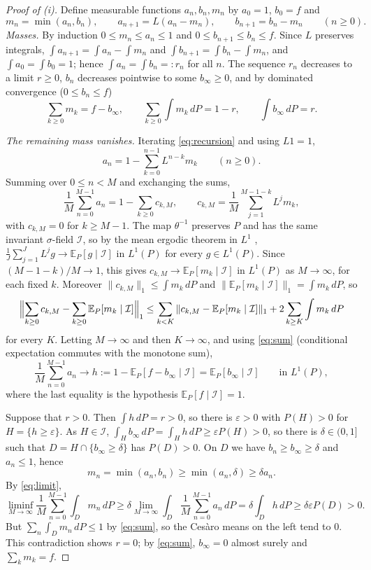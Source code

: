 \documentclass[11pt]{amsart}
\theoremstyle{remark}
\numberwithin{equation}{section}
\newcommand{\E}{\mathbb E}
\newcommand{\I}{\mathcal I}
\begin{document}
\begin{proof}[Proof of \textup{(i)}]
Define measurable functions $a_n,b_n,m_n$ by $a_0=1$, $b_0=f$ and
\begin{equation}\label{eq:recursion}
m_n=\min(a_n,b_n),\qquad a_{n+1}=L(a_n-m_n),\qquad b_{n+1}=b_n-m_n\qquad(n\ge0).
\end{equation}
\emph{Masses.} By induction $0\le m_n\le a_n\le1$ and $0\le b_{n+1}\le b_n\le f$. Since $L$ preserves integrals, $\int a_{n+1}=\int a_n-\int m_n$ and $\int b_{n+1}=\int b_n-\int m_n$, and $\int a_0=\int b_0=1$; hence $\int a_n=\int b_n=:r_n$ for all $n$. The sequence $r_n$ decreases to a limit $r\ge0$, $b_n$ decreases pointwise to some $b_\infty\ge0$, and by dominated convergence ($0\le b_n\le f$)
\begin{equation}\label{eq:sum}
\sum_{k\ge0}m_k=f-b_\infty,\qquad \sum_{k\ge0}\int m_k\,dP=1-r,\qquad \int b_\infty\,dP=r .
\end{equation}

\emph{The remaining mass vanishes.} Iterating \eqref{eq:recursion} and using $L1=1$,
\[
a_n=1-\sum_{k=0}^{n-1}L^{n-k}m_k\qquad(n\ge0).
\]
Summing over $0\le n<M$ and exchanging the sums,
\begin{equation}\label{eq:cesaro}
\frac1M\sum_{n=0}^{M-1}a_n=1-\sum_{k\ge0}c_{k,M},\qquad c_{k,M}=\frac1M\sum_{j=1}^{M-1-k}L^jm_k ,
\end{equation}
with $c_{k,M}=0$ for $k\ge M-1$. The map $\theta^{-1}$ preserves $P$ and has the same invariant $\sigma$-field $\I$, so by the mean ergodic theorem in $L^1$ \cite[Chapter~10]{Ka}, $\frac1J\sum_{j=1}^{J}L^jg\to\E_P[g\mid\I]$ in $L^1(P)$ for every $g\in L^1(P)$. Since $(M-1-k)/M\to1$, this gives $c_{k,M}\to\E_P[m_k\mid\I]$ in $L^1(P)$ as $M\to\infty$, for each fixed $k$. Moreover $\|c_{k,M}\|_1\le\int m_k\,dP$ and $\|\E_P[m_k\mid\I]\|_1=\int m_k\,dP$, so
\[
\Bigl\|\sum_{k\ge0}c_{k,M}-\sum_{k\ge0}\E_P[m_k\mid\I]\Bigr\|_1\le\sum_{k<K}\|c_{k,M}-\E_P[m_k\mid\I]\|_1+2\sum_{k\ge K}\int m_k\,dP
\]
for every $K$. Letting $M\to\infty$ and then $K\to\infty$, and using \eqref{eq:sum} (conditional expectation commutes with the monotone sum),
\begin{equation}\label{eq:limit}
\frac1M\sum_{n=0}^{M-1}a_n\longrightarrow h:=1-\E_P[f-b_\infty\mid\I]=\E_P[b_\infty\mid\I]\qquad\text{in }L^1(P),
\end{equation}
where the last equality is the hypothesis $\E_P[f\mid\I]=1$.

Suppose that $r>0$. Then $\int h\,dP=r>0$, so there is $\varepsilon>0$ with $P(H)>0$ for $H=\{h\ge\varepsilon\}$. As $H\in\I$, $\int_Hb_\infty\,dP=\int_Hh\,dP\ge\varepsilon P(H)>0$, so there is $\delta\in(0,1]$ such that $D=H\cap\{b_\infty\ge\delta\}$ has $P(D)>0$. On $D$ we have $b_n\ge b_\infty\ge\delta$ and $a_n\le1$, hence
\[
m_n=\min(a_n,b_n)\ge\min(a_n,\delta)\ge\delta a_n .
\]
By \eqref{eq:limit},
\[
\liminf_{M\to\infty}\frac1M\sum_{n=0}^{M-1}\int_Dm_n\,dP\ge\delta\lim_{M\to\infty}\int_D\frac1M\sum_{n=0}^{M-1}a_n\,dP=\delta\int_Dh\,dP\ge\delta\varepsilon P(D)>0 .
\]
But $\sum_n\int_Dm_n\,dP\le1$ by \eqref{eq:sum}, so the Ces\`aro means on the left tend to $0$. This contradiction shows $r=0$; by \eqref{eq:sum}, $b_\infty=0$ almost surely and $\sum_km_k=f$.


\end{proof}
\end{document}
